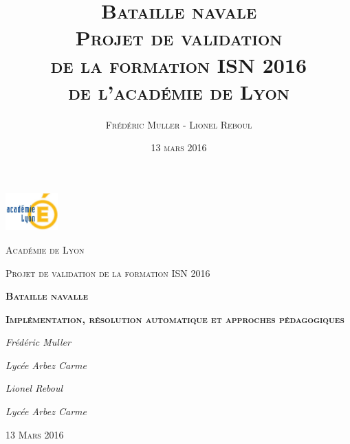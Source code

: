 \title{\Huge{\textsc{Bataille navale}}\\ \medskip \medskip\medskip\medskip \large{\textsc{Projet de validation\\de la formation ISN 2016\\de l'académie de Lyon}}}


\author{\textsc{Frédéric Muller} - \textsc{Lionel Reboul}
}
\date{\vfill \textsc{13 mars 2016}} 

\pagestyle{empty}

\begin{titlepage}
	\centering
	\includegraphics[width=0.15\textwidth]{./media/academie.jpg}\par\vspace{1cm}
	{\scshape\LARGE Académie de Lyon \par}
	\vspace{1cm}
	{\scshape\Large Projet de validation de la formation ISN 2016\par}
	\vspace{2cm}
	{\Huge\bfseries\scshape Bataille navalle\par}
	{\Large\bfseries\scshape Implémentation, résolution automatique et approches pédagogiques\par}
	\vspace{2cm}
	{\Large\itshape Frédéric Muller\par}{\large\itshape Lycée Arbez Carme\par}
	\vspace{0.8cm}
	{\Large\itshape Lionel Reboul\par}{\large\itshape Lycée Arbez Carme\par}

	\vfill

	{\scshape\large 13 Mars 2016\par}
\end{titlepage}




